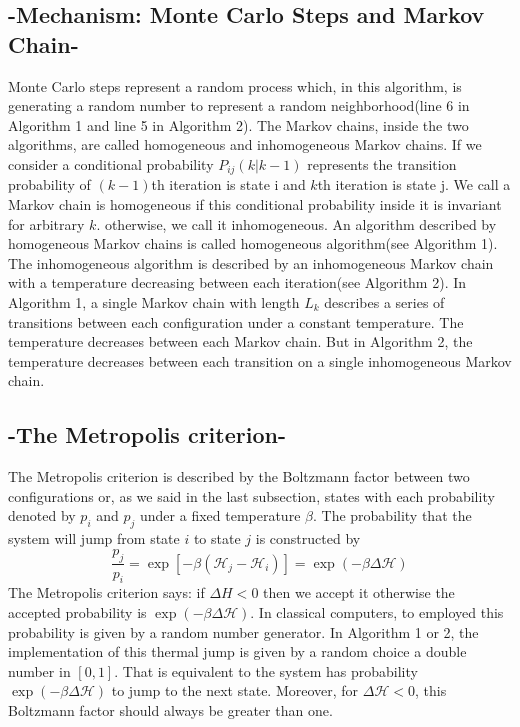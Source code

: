 \documentclass{turabian-researchpaper}
\begin{document}
    \subsection{-Mechanism: Monte Carlo Steps and Markov Chain-}
        Monte Carlo steps represent a random process which, in this algorithm, is generating a random number to represent a random neighborhood(line 6 in Algorithm 1 and line 5 in Algorithm 2). The Markov chains, inside the two algorithms, are called homogeneous and inhomogeneous Markov chains. If we consider a conditional probability $P_{ij}(k|k-1)$ represents the transition probability of $(k-1)$th iteration is state i and $k$th iteration is state j. We call a Markov chain is homogeneous if this conditional probability inside it is invariant for arbitrary $k$. otherwise, we call it inhomogeneous\cite{chibante2010simulated}. An algorithm described by homogeneous Markov chains is called homogeneous algorithm(see Algorithm 1). The inhomogeneous algorithm is described by an inhomogeneous Markov chain with a temperature decreasing between each iteration(see Algorithm 2). In Algorithm 1, a single Markov chain with length $L_k$ describes a series of transitions between each configuration under a constant temperature. The temperature decreases between each Markov chain. But in Algorithm 2, the temperature decreases between each transition on a single inhomogeneous Markov chain\cite{chibante2010simulated}.

    \subsection{-The Metropolis criterion-}
        The Metropolis criterion is described by the Boltzmann factor between two configurations or, as we said in the last subsection, states with each probability denoted by $p_i$ and $p_j$ under a fixed temperature $\beta$. The probability that the system will jump from state $i$ to state $j$ is constructed by
            \begin{equation}
                \frac{p_j}{p_i} = \exp\left[-\beta(\mathcal{H} _j-\mathcal{H} _i)\right] = \exp(-\beta\Delta \mathcal{H} )
            \end{equation}
        The Metropolis criterion says: if $\Delta H < 0$ then we accept it otherwise the accepted probability is $\exp(-\beta \Delta \mathcal{H} )$. In classical computers, to employed this probability is given by a random number generator. In Algorithm 1 or 2, the implementation of this thermal jump is given by a random choice a double number in $[0,1]$. That is equivalent to the system has probability $\exp(-\beta \Delta \mathcal{H} )$ to jump to the next state. Moreover, for $\Delta \mathcal{H}  < 0$, this Boltzmann factor should always be greater than one. 
\end{document}
